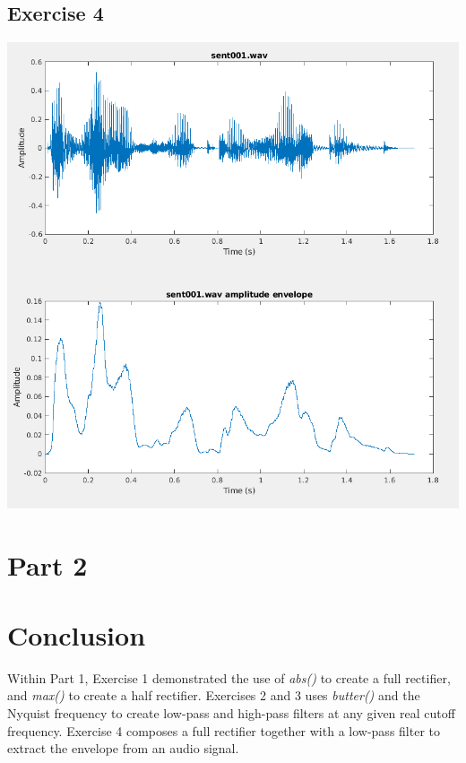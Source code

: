 \documentclass[11pt]{article}
\begin{document}
\subsection{Exercise 4}



\includegraphics[width=\textwidth]{exercise4.png}

\pagebreak

\section{Part 2}

\section{Conclusion}

Within Part 1, Exercise 1 demonstrated the use of \textit{abs()} to create a full rectifier, and \textit{max()} to create a half rectifier.
Exercises 2 and 3 uses \textit{butter()} and the Nyquist frequency to create low-pass and high-pass filters at any given real cutoff frequency.
Exercise 4 composes a full rectifier together with a low-pass filter to extract the envelope from an audio signal.
\end{document}
